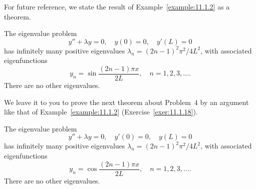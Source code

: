 For future reference, we state the result of Example~\ref{example:11.1.2} as a theorem.

\begin{theorem}
  \color{blue}
  \label{thmtype:11.1.4} The eigenvalue problem
  \[
    y''+\lambda y=0,\quad y(0)=0,\quad y'(L)=0
  \]
  has infinitely many positive eigenvalues $\lambda_{n}=(2n-1)^{2}\pi^{2}/4L^{2}$, with associated
  eigenfunctions
  \[
    y_{n}=\sin\frac{(2n-1)\pi x}{2L},\quad n=1,2,3,\dots.
  \]
  There are no other eigenvalues.
\end{theorem}

We leave it to you to prove the next theorem about Problem~4 by an argument like that of
Example~\ref{example:11.1.2} (Exercise~\ref{exer:11.1.18}).

\begin{theorem}
  \color{blue}
  \label{thmtype:11.1.5} The eigenvalue problem
  \[
    y''+\lambda y=0,\quad y'(0)=0,\quad y(L)=0
  \]
  has infinitely many positive eigenvalues $\lambda_{n}=(2n-1)^{2}\pi^{2}/4L^{2}$, with associated
  eigenfunctions
  \[
    y_{n}=\cos\frac{(2n-1)\pi x}{2L},\quad n=1,2,3,\dots.
  \]
  There are no other eigenvalues.
\end{theorem}

